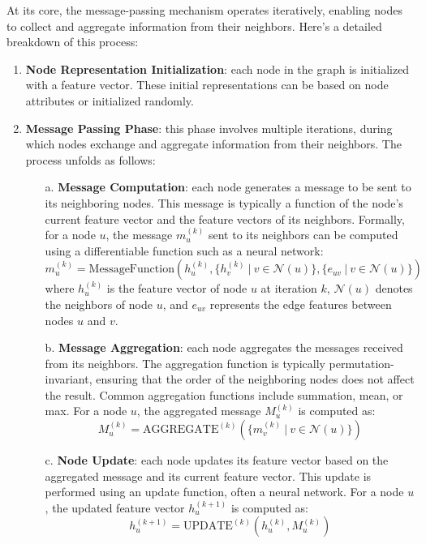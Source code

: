At its core, the message-passing mechanism operates iteratively, enabling nodes to collect and aggregate information from their neighbors.
Here's a detailed breakdown of this process:
\begin{enumerate}
    \item \textbf{Node Representation Initialization}: each node in the graph is initialized with a feature vector. These initial representations can be based on node attributes or initialized randomly.

    \item \textbf{Message Passing Phase}: this phase involves multiple iterations, during which nodes exchange and aggregate information from their neighbors. The process unfolds as follows:
    \begin{itemize}
        \item[a.] \textbf{Message Computation}: each node generates a message to be sent to its neighboring nodes. This message is typically a function of the node’s current feature vector and the feature vectors of its neighbors. Formally, for a node \(u\), the message \(m_{u}^{(k)}\) sent to its neighbors can be computed using a differentiable function such as a neural network:
        \[
        m_{u}^{(k)} = \text{MessageFunction}(h_u^{(k)}, \{h_v^{(k)}~|~v \in \mathcal{N}(u)\}, \{e_{uv}~|~v \in \mathcal{N}(u)\})
        \]
        where \(h_u^{(k)}\) is the feature vector of node \(u\) at iteration \(k\), \(\mathcal{N}(u)\) denotes the neighbors of node \(u\), and \(e_{uv}\) represents the edge features between nodes \(u\) and \(v\).
  
        \item[b.] \textbf{Message Aggregation}: each node aggregates the messages received from its neighbors. The aggregation function is typically permutation-invariant, ensuring that the order of the neighboring nodes does not affect the result. Common aggregation functions include summation, mean, or max. For a node \(u\), the aggregated message \(M_u^{(k)}\) is computed as:
        \[
        M_u^{(k)} = \text{AGGREGATE}^{(k)}(\{m_{v}^{(k)}~|~v \in \mathcal{N}(u)\})
        \]
  
        \item[c.] \textbf{Node Update}: each node updates its feature vector based on the aggregated message and its current feature vector. This update is performed using an update function, often a neural network. For a node \(u\), the updated feature vector \(h_u^{(k+1)}\) is computed as:
        \[
        h_u^{(k+1)} = \text{UPDATE}^{(k)}(h_u^{(k)}, M_u^{(k)})
        \]
    \end{itemize}


\end{enumerate}
